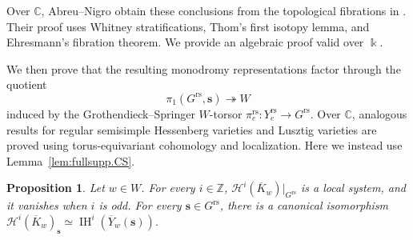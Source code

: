 \documentclass[11pt]{amsart}
\numberwithin{equation}{section}
\newtheorem{proposition}[theorem]{Proposition}
\theoremstyle{definition}
\def\cH{\mathcal {H}}
\def\C{\mathbb{C}}
\def\ZZ{\mathbb{Z}}
\def\Grs{G^{\mathrm{rs}}}
\DeclareMathOperator{\IH}{\mathrm{IH}}
\begin{document}
Over $\C$, Abreu--Nigro obtain these conclusions from the topological fibrations in \cite[Propositions~8.2 and~8.3]{AN}. 
Their proof uses Whitney stratifications, Thom's first isotopy lemma, and Ehresmann's fibration theorem.
We provide an algebraic proof valid over $\Bbbk$.


We then prove that the resulting monodromy representations factor through the quotient
\[
	\pi_1(\Grs,\mathbf{s})\twoheadrightarrow W
\]
induced by the Grothendieck--Springer $W$-torsor $\pi_e^{\mathrm{rs}}:Y_e^{\mathrm{rs}}\to \Grs$. 
Over $\C$, analogous results for regular semisimple Hessenberg varieties \cite{BrCh18,balibanu-crooks} and Lusztig varieties \cite{AN} are proved using torus-equivariant cohomology and localization. Here we instead use Lemma~\ref{lem:fullsupp.CS}.


\begin{proposition}\label{prop:fiber.IC}
	Let $w\in W$. For every $i\in \ZZ$, $\cH^i(\overline K_w)|_{\Grs}$ is a local system, and it vanishes when $i$ is odd. For every  $\mathbf{s}\in \Grs$, there is a canonical isomorphism 
	$\cH^i(\overline K_w)_{\mathbf{s}}\simeq \IH^i(\overline Y_w(\mathbf{s}))$.
\end{proposition}
\end{document}
